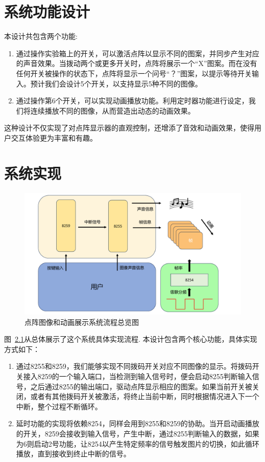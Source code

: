 \documentclass{bjtu-bachelor-thesis}
\begin{document}
\chapter{系统功能设计}

本设计共包含两个功能:
    \begin{enumerate}
        \item 通过操作实验箱上的开关，可以激活点阵以显示不同的图案，并同步产生对应的声音效果。当拨动两个或更多开关时，点阵将展示一个“X”图案。而在没有任何开关被操作的状态下，点阵将显示一个问号“？”图案，以提示等待开关输入。预计我们会设计5个开关，以支持显示5种不同的图像。
        \item 通过操作第6个开关，可以实现动画播放功能。利用定时器功能进行设定，我们将连续播放不同的图像，从而营造出动态的动画效果。
    \end{enumerate}
    
这种设计不仅实现了对点阵显示器的直观控制，还增添了音效和动画效果，使得用户交互体验更为丰富和有趣。
\vspace{0.5cm}

\chapter{系统实现}

    \begin{figure}[!htbp]
        \centering
        \includegraphics[width=1.0\textwidth]{pic/method.pdf}
        \caption{点阵图像和动画展示系统流程总览图}
        \label{fig:method}
    \end{figure}
    
图~\ref{fig:method}从总体展示了这个系统具体实现流程. 本设计包含两个核心功能，具体实现方式如下：
    \begin{enumerate}
        \item 通过8255和8259，我们能够实现不同拨码开关对应不同图像的显示。将拨码开关接入8259的一个输入端口，当检测到输入信号时，便会启动8255判断输入信号，之后通过8255的输出端口，驱动点阵显示相应的图案。如果当前开关被关闭，或者有其他拨码开关被激活，将终止当前中断，同时根据情况进入下一个中断，整个过程不断循环。
        \item 延时功能的实现将依赖8254，同样会用到8255和8259的协助。当开启动画播放的开关，8259会接收到输入信号，产生中断，通过8255判断输入的数据，如果为6则启动2号功能，让8254以产生特定频率的信号触发图片的切换，如此循环播放，直到接收到终止中断的信号。
    \end{enumerate}
    
\end{document}
